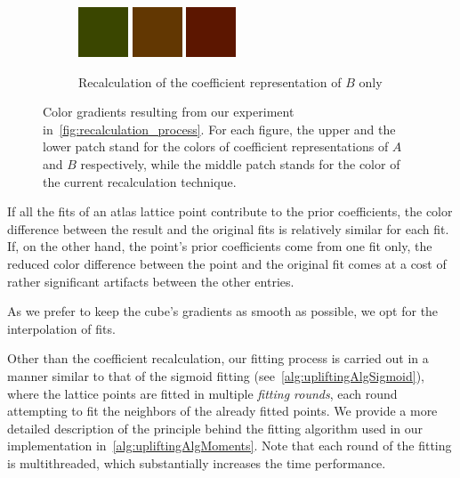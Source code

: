 \begin{figure}[t!]
\begin{subfigure}[t]{0.30\textwidth}
 		\label{fig:recalculation_colorGradients_interpolated}
 	\end{subfigure}
 	\begin{subfigure}[t]{0.30\textwidth}
 		\includegraphics[width=1\linewidth,height=4em]{img/recalculation_color_green.png}
 		\includegraphics[width=1\linewidth,height=4em]{img/recalculation_color_fitRed.png}
 		\includegraphics[width=1\linewidth,height=4em]{img/recalculation_color_red.png}
 		\caption{Recalculation of the coefficient representation of $B$ only}
 		\label{fig:recalculation_colorGradients_red}
 	\end{subfigure}
 	\caption{Color gradients resulting from our experiment in~\cref{fig:recalculation_process}. For each figure, the upper and the lower patch stand for the colors of coefficient representations of $A$ and $B$ respectively, while the middle patch stands for the color of the current recalculation technique.}
 	\label{fig:recalculation_colorGradients}
 \end{figure}
 
If all the fits of an atlas lattice point contribute to the prior coefficients, the color difference between the result and the original fits is relatively similar for each fit. If, on the other hand, the point's prior coefficients come from one fit only, the reduced color difference between the point and the original fit comes at a cost of rather significant artifacts between the other entries. 

As we prefer to keep the cube's gradients as smooth as possible, we opt for the interpolation of fits.

Other than the coefficient recalculation, our fitting process is carried out in a manner similar to that of the sigmoid fitting (see~\cref{alg:upliftingAlgSigmoid}), where the lattice points are fitted in multiple \emph{fitting rounds}, each round attempting to fit the neighbors of the already fitted points. We provide a more detailed description of the principle behind the fitting algorithm used in our implementation in~\cref{alg:upliftingAlgMoments}. Note that each round of the fitting is multithreaded, which substantially increases the time performance.

